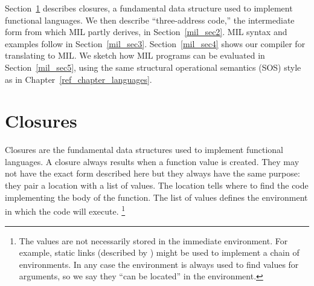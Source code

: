 \documentclass[12pt]{report}
\begin{document}
Section~\ref{mil_sec1} describes closures, a fundamental data
structure used to implement functional languages. We then describe
``three-address code,'' the intermediate form from which MIL partly
derives, in Section~\ref{mil_sec2}.  MIL syntax and examples follow in
Section~\ref{mil_sec3}. Section~\ref{mil_sec4} shows our compiler for
translating \lamC to MIL. We sketch how MIL programs can be evaluated
in Section~\ref{mil_sec5}, using the same structural operational
semantics (SOS) style as in Chapter~\ref{ref_chapter_languages}.







\section{Closures}
\label{mil_sec1}

Closures are the fundamental data structures used to implement
functional languages. A closure always results when a function value is
created. They may not have the exact form described here but they
always have the same purpose: they pair a location with a list of
values. The location tells where to find the code implementing the
body of the function. The list of values defines the environment in
which the code will execute. 
\footnote{The values are not necessarily stored in the immediate
  environment. For example, static links (described by
  \citet[pg.~125]{Appel2003}) might be used to implement a chain of
  environments. In any case the environment is always used to find
  values for arguments, so we say they ``can be located'' in the
  environment.} 
\end{document}
